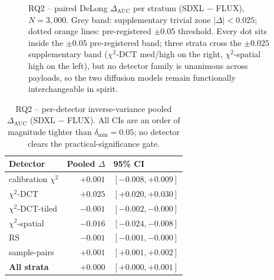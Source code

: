 \documentclass[10pt,twocolumn,a4paper]{article}
\begin{document}
\begin{figure}[t]
\caption{RQ2 -- paired DeLong $\Delta_\text{AUC}$ per stratum (SDXL $-$ FLUX), $N\!=\!3{,}000$. Grey band: supplementary trivial zone $|\Delta|\!<\!0.025$; dotted orange lines: pre-registered $\pm 0.05$ threshold. Every dot sits inside the $\pm 0.05$ pre-registered band; three strata cross the $\pm 0.025$ supplementary band ($\chi^2$-DCT med/high on the right, $\chi^2$-spatial high on the left), but no detector family is unanimous across payloads, so the two diffusion models remain functionally interchangeable in spirit.}
\label{fig:rq2}
\end{figure}

\begin{table}[t]
\centering\small
\caption{RQ2 -- per-detector inverse-variance pooled $\Delta_\text{AUC}$ (SDXL $-$ FLUX). All CIs are an order of magnitude tighter than $\delta_\text{min}\!=\!0.05$; no detector clears the practical-significance gate.}
\label{tab:rq2meta}
\setlength{\tabcolsep}{5pt}\renewcommand{\arraystretch}{1.1}
\begin{tabular}{@{}l r l@{}}
\toprule
\textbf{Detector} & \textbf{Pooled $\Delta$} & \textbf{95\% CI} \\
\midrule
calibration $\chi^2$    & $+0.001$ & $[-0.008, +0.009]$ \\
$\chi^2$-DCT            & $+0.025$ & $[+0.020, +0.030]$ \\
$\chi^2$-DCT-tiled      & $-0.001$ & $[-0.002, -0.000]$ \\
$\chi^2$-spatial        & $-0.016$ & $[-0.024, -0.008]$ \\
RS                      & $-0.001$ & $[-0.001, -0.000]$ \\
sample-pairs            & $+0.001$ & $[+0.001, +0.002]$ \\
\midrule
\textbf{All strata}     & $\boldsymbol{+0.000}$ & $\boldsymbol{[+0.000, +0.001]}$ \\
\bottomrule
\end{tabular}
\end{table}
\end{document}
